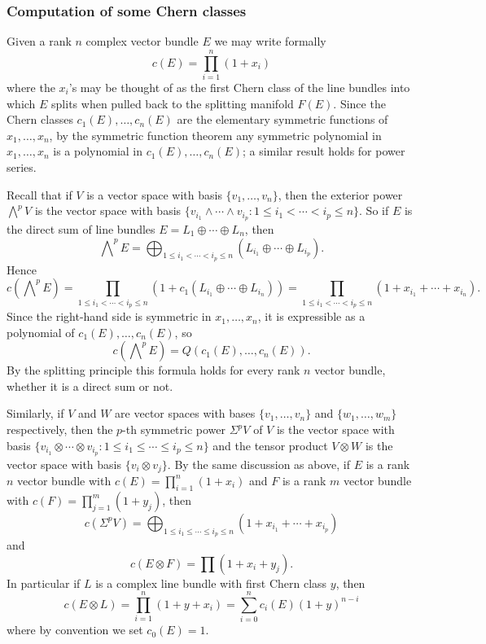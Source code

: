 \subsubsection{Computation of some Chern classes}
Given a rank $n$ complex vector bundle $E$ we may write formally
\[c(E)=\prod_{i=1}^{n}(1+x_i)\]
where the $x_i$'s may be thought of as the first Chern class of the line bundles into which $E$ splits when pulled back to the splitting manifold $F(E)$. Since the 
Chern classes $c_1(E),\dots,c_n(E)$ are the elementary symmetric functions of $x_1,\dots,x_n$, by the symmetric function theorem any symmetric polynomial in $x_1,\dots,x_n$ 
is a polynomial in $c_1(E),\dots,c_n(E)$; a similar result holds for power series.
\begin{example}
Recall that if $V$ is a vector space with basis $\{v_1,\dots,v_n\}$, then the exterior power $\bigwedge^pV$ is the vector space with basis 
$\{v_{i_1}\wedge\cdots \wedge v_{i_p}:1\leq i_1<\cdots<i_p\leq n\}$. So if $E$ is the direct sum of line bundles $E=L_1\oplus\cdots\oplus L_n$, then
\[\bigwedge\nolimits^pE=\bigoplus_{1\leq i_1<\cdots<i_p\leq n}(L_{i_1}\oplus\cdots\oplus L_{i_p}).\]
Hence
\[c(\bigwedge\nolimits^pE)=\prod_{1\leq i_1<\cdots<i_p\leq n}(1+c_1(L_{i_1}\oplus\cdots\oplus L_{i_n}))=\prod_{1\leq i_1<\cdots<i_p\leq n}(1+x_{i_1}+\cdots+x_{i_n}).\]
Since the right-hand side is symmetric in $x_1,\dots,x_n$, it is expressible as a polynomial of $c_1(E),\dots,c_n(E)$, so
\[c(\bigwedge\nolimits^pE)=Q(c_1(E),\dots,c_n(E)).\]
By the splitting principle this formula holds for every rank $n$ vector bundle, whether it is a direct sum or not.\par
Similarly, if $V$ and $W$ are vector spaces with bases $\{v_1,\dots,v_n\}$ and $\{w_1,\dots,w_m\}$ respectively, then the $p$-th symmetric power $\Sigma^pV$ of $V$ is 
the vector space with basis $\{v_{i_1}\otimes\cdots\otimes v_{i_p}:1\leq i_1\leq\cdots\leq i_p\leq n\}$ and the tensor product $V\otimes W$ is the vector space with 
basis $\{v_i\otimes v_j\}$. By the same discussion as above, if $E$ is a rank $n$ vector bundle with $c(E)=\prod_{i=1}^{n}(1+x_i)$ and $F$ is a rank $m$ vector bundle 
with $c(F)=\prod_{j=1}^{m}(1+y_j)$, then
\[c(\Sigma^pV)=\bigoplus_{1\leq i_1\leq\cdots\leq i_p\leq n}(1+x_{i_1}+\cdots+x_{i_p})\]
and
\[c(E\otimes F)=\prod(1+x_i+y_j).\]
In particular if $L$ is a complex line bundle with first Chern class $y$, then
\[c(E\otimes L)=\prod_{i=1}^{n}(1+y+x_i)=\sum_{i=0}^{n}c_i(E)(1+y)^{n-i}\]
where by convention we set $c_0(E)=1$.
\end{example}
